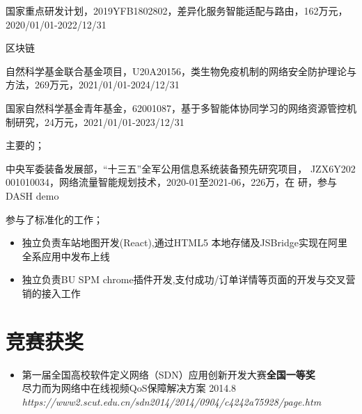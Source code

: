 \documentclass{resume}
\begin{document}

国家重点研发计划，2019YFB1802802，差异化服务智能适配与路由，162万元，2020/01/01-2022/12/31

区块链


自然科学基金联合基金项目，U20A20156，类生物免疫机制的网络安全防护理论与方法，269万元，2021/01/01-2024/12/31

国家自然科学基金青年基金，62001087，基于多智能体协同学习的网络资源管控机制研究，24万元，2021/01/01-2023/12/31

主要的；

中央军委装备发展部，“十三五”全军公用信息系统装备预先研究项目， JZX6Y202 001010034，网络流量智能规划技术，2020-01至2021-06，226万，在 研，参与
DASH demo 


参与了标准化的工作；
\begin{itemize}
  \item 独立负责车站地图开发(React),通过HTML5 本地存储及JSBridge实现在阿里全系应用中发布上线
  \item 独立负责BU SPM chrome插件开发,支付成功/订单详情等页面的开发与交叉营销的接入工作
\end{itemize}



\section{竞赛获奖}
\begin{itemize}[parsep=0.2ex]
  \item 第一届全国高校软件定义网络（SDN）应用创新开发大赛\textbf{全国一等奖}
  \\尽力而为网络中在线视频QoS保障解决方案 2014.8\\ \textit{https://www2.scut.edu.cn/sdn2014/2014/0904/c4242a75928/page.htm}
\end{itemize}
\end{document}
